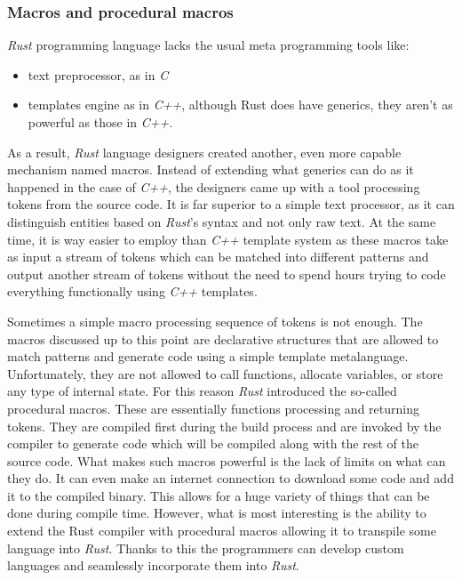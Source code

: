 \subsubsection{Macros and procedural macros}
\textit{Rust} programming language lacks the usual meta programming tools like:
\begin{itemize}
    \item text preprocessor, as in \textit{C}
    \item templates engine as in \textit{C++}, although Rust does have generics, they aren't as powerful as those in \textit{C++}.
\end{itemize}
As a result, \textit{Rust} language designers created another, even more capable mechanism named macros. Instead of extending what generics can do as it happened in the case of \textit{C++}, the designers came up with a tool processing tokens from the source code. It is far superior to a simple text processor, as it can distinguish entities based on \textit{Rust}'s syntax and not only raw text. At the same time, it is way easier to employ than \textit{C++} template system as these macros take as input a stream of tokens which can be matched into different patterns and output another stream of tokens without the need to spend hours trying to code everything functionally using \textit{C++} templates. 

Sometimes a simple macro processing sequence of tokens is not enough. The macros discussed up to this point are declarative structures that are allowed to match patterns and generate code using a simple template metalanguage. Unfortunately, they are not allowed to call functions, allocate variables, or store any type of internal state. For this reason \textit{Rust} introduced the so-called procedural macros. These are essentially functions processing and returning tokens. They are compiled first during the build process and are invoked by the compiler to generate code which will be compiled along with the rest of the source code. What makes such macros powerful is the lack of limits on what can they do. It can even make an internet connection to download some code and add it to the compiled binary. This allows for a huge variety of things that can be done during compile time. However, what is most interesting is the ability to extend the Rust compiler with procedural macros allowing it to transpile some language into \textit{Rust}. Thanks to this the programmers can develop custom languages and seamlessly incorporate them into \textit{Rust}.

